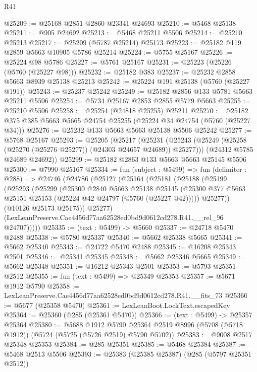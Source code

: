 \begin{lexlean}{R41}
\begin{coremodule}
@25209 := @25168 @2851 @2860 @23341 @24693
@25210 := @5468 @25138
@25211 := @905 @24692
@25213 := @5468 @25211 @5506
@25214 := @25210 @25213
@25217 := @25209 (@5787 @25214) @25173
@25223 := @25182 @119 @2859 @5663 @10905 @5786 @25214
@25224 := @5755 @25167
@25226 := @25224 @98 @5786
@25227 := @5761 @25167
@25231 := @25223 (@25226 (@5760 (@25227 @98)))
@25232 := @25182 @383
@25237 := @25232 @2858 @5663 @8939 @25138 @25213
@25242 := @25224 @191 @25138 (@5760 (@25227 @191))
@25243 := @25237 @25242
@25249 := @25182 @2856 @133 @5781 @5663 @25211 @5506
@25254 := @5734 @25167 @2853 @2855 @5779 @5663
@25255 := @25210 @5506
@25258 := @25254 (@24818 @25255) @25211
@25270 := @25182 @375 @385 @5663 @5665 @24754 @25255 (@25224 @34 @24754 (@5760 (@25227 @34)))
@25276 := @25232 @133 @5663 @5663 @25138 @5506 @25242
@25277 := @5768 @25167
@25293 := @25205
    (@25217
      (@25231 (@25243 (@25249 (@25258 (@25270 (@25276 @25277)) (@24303 @24657 @24689)) @25277)))
      (@24312 @5785 @24689 @24692))
@25299 := @25182 @2863 @133 @5663 @5663 @25145 @5506
@25300 := @7990 @25167
@25334 := fun (subject : @5499) =>
  fun (delimiter : @288) =>
  @24746
    (@24786
      (@25127
        (@25164
          (@25181
            (@25188
              (@25199
                (@25293
                  (@25299
                    (@25300
                      @2840
                      @5663
                      @25138
                      @25145
                      (@25300 @377 @5663 @25151 @25153 (@25224 @42 @24797 (@5760 (@25227 @42)))))
                    @25277))
                (@10126 @25173 @25175))
              @25277)
            (LexLeanPreserve.Cae4456d77aa62528ed0bd9d0612cd278.R41.__rel_96 @24707)))))
@25335 := (text : @5499) -> @5660
@25337 := @24718 @5470 @2488
@25338 := @5780 @25337
@25340 := @5662 @25338 @5665
@25341 := @5662 @25340
@25343 := @24722 @5470 @2488
@25345 := @16208 @25343 @2501
@25346 := @25341 @25345
@25348 := @5662 @25346 @5665
@25349 := @5662 @25348
@25351 := @16212 @25343 @2501
@25353 := @5793 @25351 @2512
@25355 := fun (text : @5499) => @25349 @25353
@25357 := @5671 @1912 @5790
@25358 := LexLeanPreserve.Cae4456d77aa62528ed0bd9d0612cd278.R41.__fits_73
@25360 := @5677 (@25358 @5470)
@25361 := LexLeanBoot.LockText.escapedKey
@25364 := @25360 (@285 (@25361 @5470))
@25366 := (text : @5499) -> @25357 @25364
@25380 := @5688
    @1912
    @5790
    @25364
    @2519
    @8996
    (@5708 (@5718 @1912))
    (@5724 (@5725 (@5726 @2519) @5790 @5702))
@25383 := @9008 @2517 @25348 @25353
@25384 := @285 @25351
@25385 := @5468 @25384
@25387 := @5468 @2513 @5506
@25393 := @25383 (@25385 @25387) (@285 (@5797 @25351 @2512))

\end{coremodule}
\end{lexlean}
